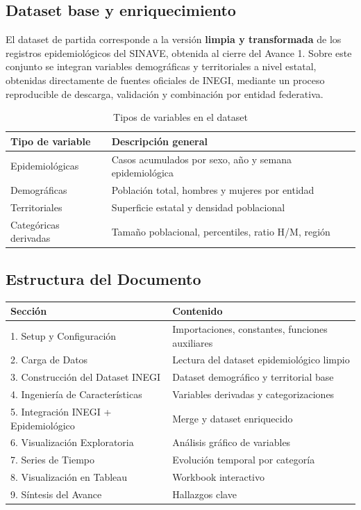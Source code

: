 \documentclass[12pt,letterpaper]{article}
\begin{document}
\subsection*{Dataset base y enriquecimiento}

El dataset de partida corresponde a la versión \textbf{limpia y transformada} de los registros epidemiológicos del SINAVE, obtenida al cierre del Avance 1. Sobre este conjunto se integran variables demográficas y territoriales a nivel estatal, obtenidas directamente de fuentes oficiales de INEGI, mediante un proceso reproducible de descarga, validación y combinación por entidad federativa.

\begin{table}[H]
\centering
\caption{Tipos de variables en el dataset}
\begin{tabular}{ll}
\toprule
\textbf{Tipo de variable} & \textbf{Descripción general} \\
\midrule
Epidemiológicas & Casos acumulados por sexo, año y semana epidemiológica \\
Demográficas & Población total, hombres y mujeres por entidad \\
Territoriales & Superficie estatal y densidad poblacional \\
Categóricas derivadas & Tamaño poblacional, percentiles, ratio H/M, región \\
\bottomrule
\end{tabular}
\end{table}

\subsection*{Estructura del Documento}

\begin{table}[H]
\centering
\small
\begin{tabular}{ll}
\toprule
\textbf{Sección} & \textbf{Contenido} \\
\midrule
1. Setup y Configuración & Importaciones, constantes, funciones auxiliares \\
2. Carga de Datos & Lectura del dataset epidemiológico limpio \\
3. Construcción del Dataset INEGI & Dataset demográfico y territorial base \\
4. Ingeniería de Características & Variables derivadas y categorizaciones \\
5. Integración INEGI + Epidemiológico & Merge y dataset enriquecido \\
6. Visualización Exploratoria & Análisis gráfico de variables \\
7. Series de Tiempo & Evolución temporal por categoría \\
8. Visualización en Tableau & Workbook interactivo \\
9. Síntesis del Avance & Hallazgos clave \\
\bottomrule
\end{tabular}
\end{table}
\end{document}
